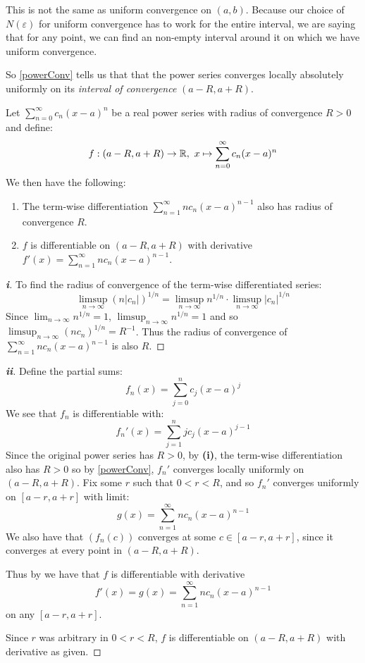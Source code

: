\documentclass[../main.tex]{subfiles}
\begin{document}
\begin{remark}[Intuition]
  This is not the same as uniform convergence on $(a, b)$.
  Because our choice of $N(\varepsilon)$ for uniform convergence has to work for the entire interval, we are saying that for any point, we can find an non-empty interval around it on which we have uniform convergence.
\end{remark}
So \cref{powerConv} tells us that that the power series converges locally absolutely uniformly on its \textit{interval of convergence} $(a - R, a + R)$.
\begin{theorem}
  Let $\sum_{n = 0}^{\infty} c_n (x - a)^n$ be a real power series with radius of convergence $R > 0$ and define: \label{diffPowerSeries}
  \[
    f: (a - R,  a + R) \to \mathbb{R},\ x \mapsto \sum_{n = 0}^{\infty} c_n (x - a)^n
  \]
  We then have the following:
  \begin{enumerate}
    \item The term-wise differentiation $\sum_{n = 1}^{\infty} n c_n(x - a)^{n - 1}$ also has radius of convergence $R$.
    \item $f$ is differentiable on $(a - R, a + R)$ with derivative $f'(x) = \sum_{n = 1}^{\infty} n c_n(x - a)^{n - 1}$.
  \end{enumerate}
\end{theorem}
\begin{proof}[\textbf{i}]
  To find the radius of convergence of the term-wise differentiated series:
  \[
    \limsup_{n \to \infty} (n |c_n|)^{1/n} = \limsup_{n \to \infty} n^{1/n} \cdot \limsup_{n \to \infty} |c_n|^{1/n}
  \]
  Since $\lim_{n \to \infty} n^{1/n} = 1$, $\limsup_{n \to \infty} n^{1/n} = 1$ and so $\limsup_{n \to \infty} (nc_n)^{1/n} = R^{-1}$.
  Thus the radius of convergence of $\sum_{n = 1}^{\infty} n c_n (x - a)^{n - 1}$ is also $R$.
\end{proof}
\begin{proof}[\textbf{ii}]
  Define the partial sums:
  \[
    f_n(x) = \sum_{j = 0}^{n} c_j (x - a)^j
  \]
  We see that $f_n$ is differentiable with:
  \[
    f_n'(x) = \sum_{j = 1}^{n} j c_j (x - a)^{j - 1}
  \]
  Since the original power series has $R > 0$, by \textbf{(i)}, the term-wise differentiation also has $R > 0$ so by \cref{powerConv}, $f_n'$ converges locally uniformly on $(a - R, a + R)$.
  Fix some $r$ such that $0 < r < R$, and so $f_n'$ converges uniformly on $[a - r, a + r]$ with limit:
  \[
    g(x) = \sum_{n = 1}^{\infty} nc_n(x - a)^{n - 1}
  \]
  We also have that $(f_n(c))$ converges at some $c \in [a - r, a + r]$, since it converges at every point in $(a - R, a + R)$.

  Thus by we have that $f$ is differentiable with derivative
  \[
    f'(x) = g(x) =  \sum_{n = 1}^{\infty} n c_n (x - a)^{n - 1}
  \]
  on any $[a - r, a + r]$.

  Since $r$ was arbitrary in $0 < r < R$, $f$ is differentiable on $(a - R, a + R)$ with derivative as given.
\end{proof}
\end{document}
